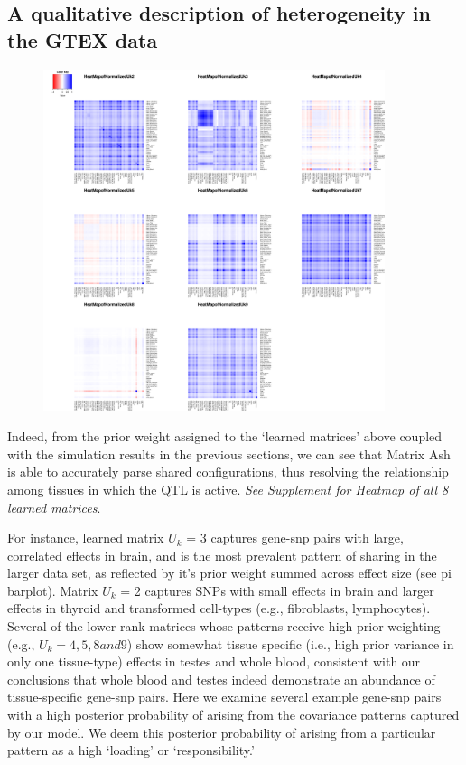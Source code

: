 \subsection{A qualitative description of heterogeneity in the GTEX data}
\begin{figure}[htbp]
\includegraphics[width=10cm]{Figures/gtexresultcompiledheatmaps.png}
\end{figure}\newline

 
Indeed, from the prior weight assigned to the `learned matrices' above coupled with the simulation results in the previous sections, we can see that Matrix Ash is able to accurately parse shared configurations, thus resolving the relationship among tissues in which the QTL is active. \textit{See Supplement for Heatmap of all 8 learned matrices}. 

For instance, learned matrix $U_{k}$ = 3 captures gene-snp pairs with large, correlated effects in brain, and is the most prevalent pattern of sharing in the larger data set, as reflected by it's prior weight summed across effect size (see pi barplot). Matrix $U_{k}$ = 2 captures SNPs with small effects in brain and larger effects in thyroid and transformed cell-types (e.g., fibroblasts, lymphocytes). Several of the lower rank matrices whose patterns receive high prior weighting (e.g., $U_{k} = 4,5,8 and 9$) show somewhat tissue specific (i.e., high prior variance in only one tissue-type) effects in testes and whole blood, consistent with our conclusions that whole blood and testes indeed demonstrate an abundance of tissue-specific gene-snp pairs. Here we examine several example gene-snp pairs with a high posterior probability of arising from the covariance patterns captured by our model. We deem this posterior probability of arising from a particular pattern as a high `loading' or `responsibility.' 


